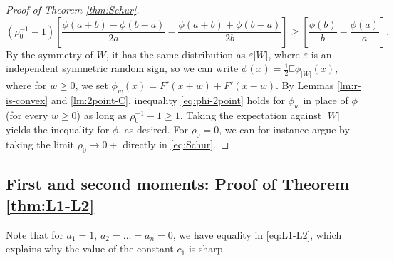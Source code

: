 \documentclass[10pt]{article}
\newcommand{\E}{\mathbb{E}}
\newcommand{\1}{\textbf{1}}
\theoremstyle{remark}
\theoremstyle{definition}
\begin{document}
\begin{proof}[Proof of Theorem \ref{thm:Schur}]
\begin{equation}\label{eq:phi-2point}
(\rho_0^{-1}-1)\left[\frac{\phi(a+b)-\phi(b-a)}{2a} - \frac{\phi(a+b)+\phi(b-a)}{2b}\right] \geq \left[ \frac{\phi(b)}{b}-\frac{\phi(a)}{a}\right].
\end{equation}
By the symmetry of $W$, it has the same distribution as $\varepsilon |W|$, where $\varepsilon$ is an independent symmetric random sign, so we can write $\phi(x) = \frac{1}{2}\E\phi_{|W|}(x)$, where for $w \geq 0$, we set $\phi_w(x) = F'(x+w) + F'(x-w)$. By Lemmas \ref{lm:r-is-convex} and \ref{lm:2point-C}, inequality \eqref{eq:phi-2point} holds for $\phi_w$ in place of $\phi$ (for every $w \geq 0$) as long as $\rho_0^{-1} - 1 \geq 1$. Taking the expectation against $|W|$ yields the inequality for $\phi$, as desired. For $\rho_0 =0$, we can for instance argue by taking the limit $\rho_0 \to 0+$ directly in \eqref{eq:Schur}.
\end{proof}



\subsection{First and second moments: Proof of Theorem \ref{thm:L1-L2}}



Note that for $a_1 = 1$, $a_2 = \dots = a_n = 0$, we have equality in \eqref{eq:L1-L2}, which explains why the value of the constant $c_1$ is sharp.
\end{document}
